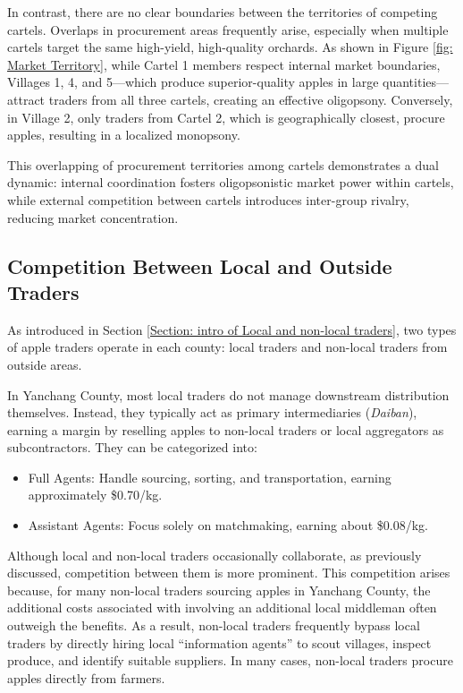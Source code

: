 In contrast, there are no clear boundaries between the territories of competing cartels. Overlaps in procurement areas frequently arise, especially when multiple cartels target the same high-yield, high-quality orchards. As shown in Figure \ref{fig: Market Territory}, while Cartel 1 members respect internal market boundaries, Villages 1, 4, and 5—which produce superior-quality apples in large quantities—attract traders from all three cartels, creating an effective oligopsony. Conversely, in Village 2, only traders from Cartel 2, which is geographically closest, procure apples, resulting in a localized monopsony.

This overlapping of procurement territories among cartels demonstrates a dual dynamic: internal coordination fosters oligopsonistic market power within cartels, while external competition between cartels introduces inter-group rivalry, reducing market concentration. 



\subsection{Competition Between Local and Outside Traders}
\noindent 
As introduced in Section \ref{Section: intro of Local and non-local traders}, two types of apple traders operate in each county: local traders and non-local traders from outside areas.

In Yanchang County, most local traders do not manage downstream distribution themselves. Instead, they typically act as primary intermediaries (\textit{Daiban}), earning a margin by reselling apples to non-local traders or local aggregators as subcontractors. They can be categorized into:
\begin{itemize}
    \item Full Agents: Handle sourcing, sorting, and transportation, earning approximately \$0.70/kg.
    \item Assistant Agents: Focus solely on matchmaking, earning about \$0.08/kg.
\end{itemize}

Although local and non-local traders occasionally collaborate, as previously discussed, competition between them is more prominent. This competition arises because, for many non-local traders sourcing apples in Yanchang County, the additional costs associated with involving an additional local middleman often outweigh the benefits. As a result, non-local traders frequently bypass local traders by directly hiring local “information agents” to scout villages, inspect produce, and identify suitable suppliers. In many cases, non-local traders procure apples directly from farmers.

